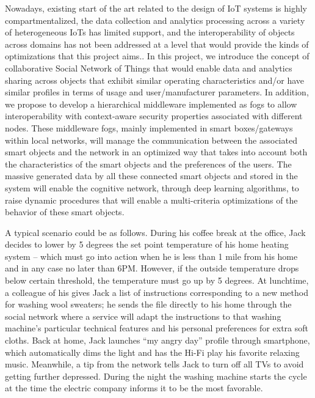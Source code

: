Nowadays, existing start of the art related to the design of IoT systems is highly compartmentalized, the data collection and analytics processing across a variety of heterogeneous IoTs has limited support, and the interoperability of objects across domains has not been addressed at a level that would provide the kinds of optimizations that this project aims.. In this project, we introduce the concept of collaborative Social Network of Things that would enable data and analytics sharing across objects that exhibit similar operating characteristics and/or have similar profiles in terms of usage and user/manufacturer parameters. In addition, we propose to develop a hierarchical middleware implemented as fogs to allow interoperability with context-aware security properties associated with different nodes. These middleware fogs, mainly implemented in smart boxes/gateways within local networks, will manage the communication between the associated smart objects and the network in an optimized way that takes into account both the characteristics of the smart objects and the preferences of the users. The massive generated data by all these connected smart objects and stored in the system will enable the cognitive network, through deep learning algorithms, to raise dynamic procedures that will enable a multi-criteria optimizations of the  behavior  of these smart objects.

A typical scenario could be as follows. During his  coffee break at the office, Jack decides to lower by 5 degrees the set point temperature of his home heating system – which must go into action when he is less than 1 mile from his home and in any case no later than 6PM. However, if the outside temperature drops below certain threshold, the temperature must go up by 5 degrees. At lunchtime, a colleague of his gives Jack a list of instructions corresponding to a new method for washing wool sweaters; he  sends the file directly to his home through the social network where a service will adapt the instructions to that washing machine’s particular technical features and his personal preferences for extra soft cloths. Back at home, Jack launches “my angry day” profile through  smartphone, which automatically dims the light and has the Hi-Fi play his favorite relaxing music. Meanwhile, a tip from the network tells Jack to turn off all TVs to avoid getting further depressed. During the night the washing machine starts the cycle at the time the electric company informs it to be the most favorable.


